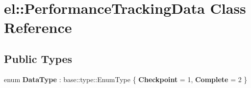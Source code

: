 \hypertarget{classel_1_1PerformanceTrackingData}{\section{el\-:\-:Performance\-Tracking\-Data Class Reference}
\label{classel_1_1PerformanceTrackingData}
}
\subsection*{Public Types}
\begin{DoxyCompactItemize}
\item 
enum {\bfseries Data\-Type} \-: base\-::type\-::\-Enum\-Type \{ {\bfseries Checkpoint} = 1, 
{\bfseries Complete} = 2
 \}
\end{DoxyCompactItemize}
